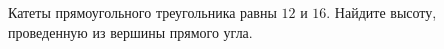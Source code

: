 \begin{ex}
	\begin{condition}
		Катеты прямоугольного треугольника равны \( 12  \) и \( 16 \). Найдите высоту, проведенную из вершины прямого угла.
	\end{condition}
\end{ex}